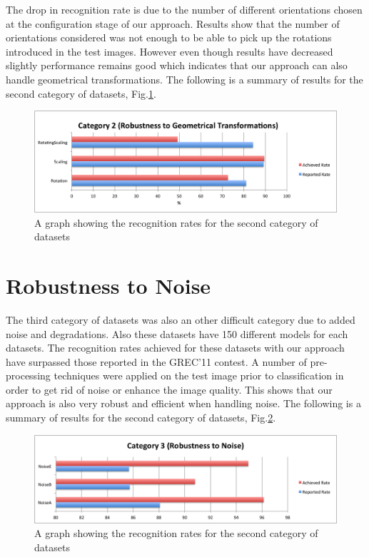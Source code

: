 The drop in recognition rate is due to the number of different orientations chosen at the configuration stage of our approach. Results show that the number of orientations considered was not enough to be able to pick up the rotations introduced in the test images. However even though results have decreased slightly performance remains good which indicates that our approach can also handle geometrical transformations. The following is a  summary of results for the second category of datasets, Fig.\ref{fig:cat2results}.

\begin{figure}[h]
        \centering
        \includegraphics[width=1.0\textwidth]{figures/discussion/results2.png}
        \caption[Recognition rates for the second category of datasets]{A graph showing the recognition rates for the second category of datasets}
        \label{fig:cat2results}
\end{figure}


\section{Robustness to Noise}
The third category of datasets was also an other difficult category due to added noise and degradations. Also these datasets have 150 different models for each datasets. The recognition rates achieved for these datasets with our approach have surpassed those reported in the GREC'11 contest. A number of pre-processing techniques were applied on the test image prior to classification in order to get rid of noise or enhance the image quality. This shows that our approach is also very robust and efficient when handling noise. The following is a  summary of results for the second category of datasets, Fig.\ref{fig:cat3results}.


\begin{figure}[h]
        \centering
        \includegraphics[width=1.0\textwidth]{figures/discussion/results3.png}
        \caption[Recognition rates for the second category of datasets]{A graph showing the recognition rates for the second category of datasets}
        \label{fig:cat3results}
\end{figure}

